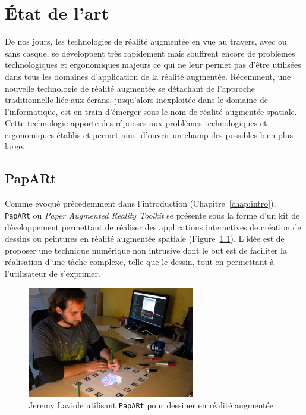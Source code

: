 \chapter{État de l'art}

De nos jours, les technologies de réalité augmentée en vue au travers, avec ou sans casque, se développent très rapidement mais souffrent encore de problèmes technologiques et ergonomiques majeurs ce qui ne leur permet pas d'être utilisées dans tous les domaines d'application de la réalité augmentée\cite{li2017state}. 
Récemment, une nouvelle technologie de réalité augmentée se détachant de l'approche traditionnelle liée aux écrans, jusqu'alors inexploitée dans le domaine de l'informatique, est en train d'émerger sous le nom de réalité augmentée spatiale. Cette technologie apporte des réponses aux problèmes technologiques et ergonomiques établis et permet ainsi d'ouvrir un champ des possibles bien plus large\cite{bimber2006modern}.

\section{PapARt}
\label{sec:papart}
Comme évoqué précedemment dans l'introduction (Chapitre~\ref{chap:intro}), \texttt{PapARt} ou \emph{Paper Augmented Reality Toolkit} se présente sous la forme d'un kit de développement permettant de réaliser des applications interactives de création de dessins ou peintures en réalité augmentée spatiale (Figure~\ref{fig:papartdemo}). L'idée est de proposer une technique numérique non intrusive dont le but est de faciliter la réalisation d'une tâche complexe, telle que le dessin, tout en permettant à l'utilisateur de s'exprimer\cite{laviole2012papart}.

\begin{figure}[H]
\centering
\includegraphics[width=0.65\textwidth]{images/papart-demo}
\caption{Jeremy Laviole utilisant \texttt{PapARt} pour dessiner en réalité augmentée\protect\footnotemark}
\label{fig:papartdemo}
\end{figure}

